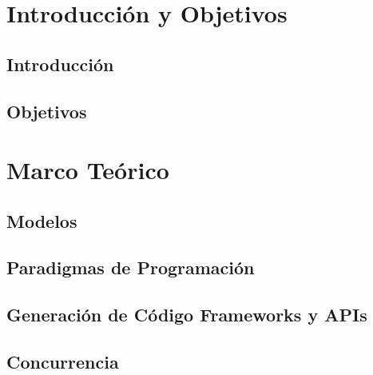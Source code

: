 \documentclass{report}
\newcounter{definitionsCounter}
\begin{document}
    \tableofcontents
    
    \listoffigures
    \listoftables


    \setcounter{definitionsCounter}{0}
    \part{Introducción y Objetivos}
        \chapter{Introducción}
        
        \chapter{Objetivos}
        
    \part{Marco Teórico}
        \label{cap:marco_teorico}
        
        \chapter{Modelos}
            
        \chapter{Paradigmas de Programación}
            
            
            
        \chapter{Generación de Código Frameworks y APIs}
            \label{generacion_frameworks_apis}
            
            
        \chapter{Concurrencia}
            
\end{document}
